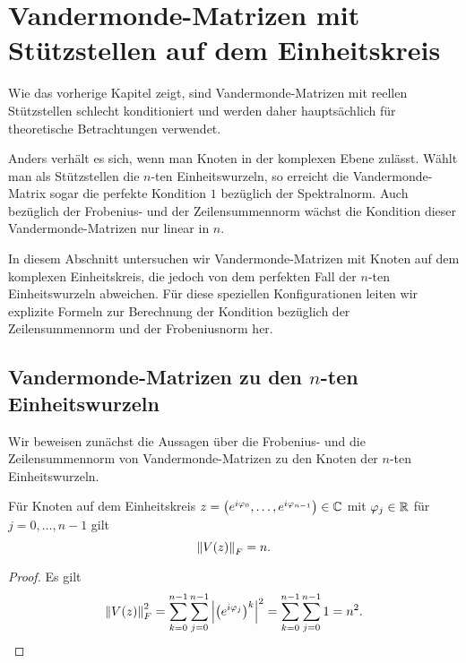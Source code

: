 \chapter{Vandermonde-Matrizen mit Stützstellen auf dem Einheitskreis}

Wie das vorherige Kapitel zeigt, sind Vandermonde-Matrizen mit reellen
Stützstellen schlecht konditioniert und werden daher hauptsächlich für
theoretische Betrachtungen verwendet.

Anders verhält es sich, wenn man Knoten in der komplexen Ebene zulässt.
Wählt man als Stützstellen die $n$-ten Einheitswurzeln, so erreicht die
Vandermonde-Matrix sogar die perfekte Kondition $1$ bezüglich der Spektralnorm.
Auch bezüglich der Frobenius- und der Zeilensummennorm wächst die Kondition
dieser Vandermonde-Matrizen nur linear in $n$.

In diesem Abschnitt untersuchen wir Vandermonde-Matrizen mit Knoten auf dem
komplexen Einheitskreis, die jedoch von dem perfekten Fall der $n$-ten
Einheitswurzeln abweichen.
Für diese speziellen Konfigurationen leiten wir explizite Formeln zur
Berechnung der Kondition bezüglich der Zeilensummennorm und der Frobeniusnorm
her.

\section{Vandermonde-Matrizen zu den \boldmath $n$-ten Einheitswurzeln}


Wir beweisen zunächst die Aussagen über die Frobenius- und die Zeilensummennorm
von Vandermonde-Matrizen zu den Knoten der $n$-ten Einheitswurzeln.
\begin{lemma}
    \label{lemma:frobenius_norm_vandermonde_unit_circle}
    Für Knoten auf dem Einheitskreis
    $z = \left(e^{i \varphi_0}, \dots, e^{i \varphi_{n-1}} \right) \in \mathbb{C}$
    mit $\varphi_j \in \mathbb{R}$ für $j = 0, \dots, n-1$ gilt
    \begin{equation}
        \left\lVert V \! \left( z \right) \right\rVert_F = n.
    \end{equation}
\end{lemma}
\begin{proof}
    Es gilt
    \[
        \left\lVert V \! \left( z \right) \right\rVert_F^2
        = \sum_{k=0}^{n-1} \sum_{j=0}^{n-1} \left\lvert  \left(e^{i \varphi_j}\right)^k  \right\rvert^2
        = \sum_{k=0}^{n-1} \sum_{j=0}^{n-1} 1
        = n^2.
    \]
\end{proof}

